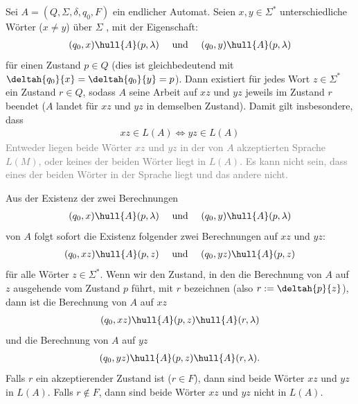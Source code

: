 \begin{mytheorem}\label{mytheorem:pfad_invarianz}
	Sei $A = (Q,\Sigma,\delta,q_0,F)$ ein endlicher Automat. Seien $x,y\in\Sigma^*$ unterschiedliche Wörter ($x\neq y$) über $\Sigma$ , mit der Eigenschaft:
	\begin{align*}
		(q_0,x)\hull{A} (p,\lambda) \quad \text{ und } \quad (q_0,y)\hull{A} (p,\lambda)
	\end{align*}
	für einen Zustand $p\in Q$ (dies ist gleichbedeutend mit $\deltah{q_0}{x} = \deltah{q_0}{y} = p$). Dann existiert für jedes Wort $z\in\Sigma^*$ ein Zustand $r\in Q$, sodass $A$ seine Arbeit auf $xz$ und $yz$ jeweils im Zustand $r$ beendet ($A$ landet für $xz$ und $yz$ in demselben Zustand). Damit gilt insbesondere, dass
	\begin{align*}
		xz \in L(A) \Longleftrightarrow yz \in L(A)
	\end{align*}
	\textcolor{Gray}{Entweder liegen beide Wörter $xz$ und $yz$ in der von $A$ akzeptierten Sprache $L(M)$, oder keines der beiden Wörter liegt in $L(A)$. Es kann nicht sein, dass eines der beiden Wörter in der Sprache liegt und das andere nicht.}

	\begin{myproof}
		Aus der Existenz der zwei Berechnungen
		\begin{align*}
			(q_0,x)\hull{A} (p,\lambda) \quad \text{ und } \quad (q_0,y)\hull{A} (p,\lambda)
		\end{align*}
		von $A$ folgt sofort die Existenz folgender zwei Berechnungen auf $xz$ und $yz$:
		\begin{align*}
			(q_0,xz)\hull{A} (p,z) \quad \text{ und } \quad (q_0,yz)\hull{A} (p,z)
		\end{align*}
		für alle Wörter $z\in\Sigma^*$. Wenn wir den Zustand, in den die Berechnung von $A$ auf $z$ ausgehende vom Zustand $p$ führt, mit $r$ bezeichnen (also $r:= \deltah{p}{z}$), dann ist die Berechnung von $A$ auf $xz$
		\begin{align*}
			(q_0,xz)\hull{A} (p,z)\hull{A} (r,\lambda)
		\end{align*}
		und die Berechnung von $A$ auf $yz$
		\begin{align*}
			(q_0,yz)\hull{A} (p,z)\hull{A} (r,\lambda).
		\end{align*}
		Falls $r$ ein akzeptierender Zustand ist ($r\in F$), dann sind beide Wörter $xz$ und $yz$ in $L(A)$. Falls $r\notin F$, dann sind beide Wörter $xz$ und $yz$ nicht in $L(A)$.
	\end{myproof}
\end{mytheorem}

